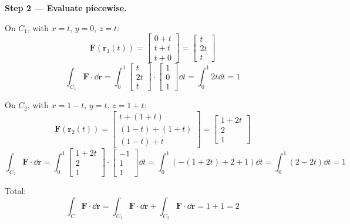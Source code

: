 \begin{example}
  \textbf{Step 2 — Evaluate piecewise.}

  On $C_1$, with $x=t,\,y=0,\,z=t$:
  \[
    \mathbf{F}(\mathbf{r}_1(t))
    =
    \begin{bmatrix}
      0+t \\t+t\\t+0
    \end{bmatrix}
    =
    \begin{bmatrix}
      t \\2t\\t
    \end{bmatrix}
  \]
  \[
    \int_{C_1}\mathbf{F}\cdot \dd{\mathbf{r}}
    = \int_0^1
    \begin{bmatrix}
      t \\2t\\t
    \end{bmatrix}
    \cdot
    \begin{bmatrix}
      1 \\0\\1
    \end{bmatrix}
    \dd{t}
    = \int_0^1 2t\dd{t} = 1
  \]

  On $C_2$, with $x=1-t,\,y=t,\,z=1+t$:
  \[
    \mathbf{F}(\mathbf{r}_2(t))
    =
    \begin{bmatrix}
      t+(1+t) \\(1-t)+(1+t)\\(1-t)+t
    \end{bmatrix}
    =
    \begin{bmatrix}
      1+2t \\2\\1
    \end{bmatrix}
  \]
  \[
    \int_{C_2}\mathbf{F}\cdot \dd{\mathbf{r}}
    = \int_0^1
    \begin{bmatrix}
      1+2t \\2\\1
    \end{bmatrix}
    \cdot
    \begin{bmatrix}
      -1 \\1\\1
    \end{bmatrix}
    \dd{t}
    = \int_0^1 (-(1+2t)+2+1)\dd{t}
    = \int_0^1 (2-2t)\dd{t} = 1
  \]

  Total:
  \[
    \int_C \mathbf{F}\cdot \dd{\mathbf{r}}
    = \int_{C_1}\mathbf{F}\cdot \dd{\mathbf{r}} + \int_{C_2}\mathbf{F}\cdot \dd{\mathbf{r}}
    = 1 + 1 = 2
  \]
\end{example}

